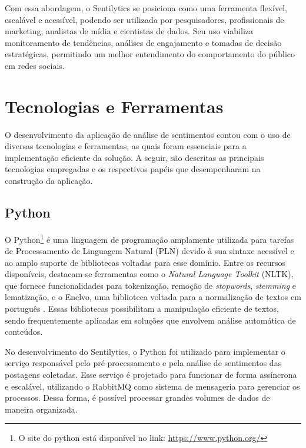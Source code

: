 \documentclass[
	12pt,				%
	oneside,			%
	a4paper,			%
	english,			%
	french,				%
	spanish,			%
	brazil				%
	]{abntex2}
\begin{document}
Com essa abordagem, o Sentilytics se posiciona como uma ferramenta
flexível, escalável e acessível, podendo ser utilizada por
pesquisadores, profissionais de marketing, analistas de mídia e
cientistas de dados. Seu uso viabiliza monitoramento de tendências,
análises de engajamento e tomadas de decisão estratégicas, permitindo um
melhor entendimento do comportamento do público em redes sociais.

\hypertarget{tecnologias-e-ferramentas}{%
\section{Tecnologias e Ferramentas}\label{tecnologias-e-ferramentas}}

O desenvolvimento da aplicação de análise de sentimentos contou com o
uso de diversas tecnologias e ferramentas, as quais foram essenciais
para a implementação eficiente da solução. A seguir, são descritas as
principais tecnologias empregadas e os respectivos papéis que
desempenharam na construção da aplicação.

\hypertarget{python}{%
\subsection{Python}\label{python}}

O Python\footnote{O site do python está disponível no link:
  \url{https://www.python.org/}} é uma linguagem de programação
amplamente utilizada para tarefas de Processamento de Linguagem Natural
(PLN) devido à sua sintaxe acessível e ao amplo suporte de bibliotecas
voltadas para esse domínio. Entre os recursos disponíveis, destacam-se
ferramentas como o \emph{Natural Language Toolkit} (NLTK), que fornece
funcionalidades para tokenização, remoção de \emph{stopwords},
\emph{stemming} e lematização, e o Enelvo, uma biblioteca voltada para a
normalização de textos em português \cite{bertaglia2016exploring}. Essas
bibliotecas possibilitam a manipulação eficiente de textos, sendo
frequentemente aplicadas em soluções que envolvem análise automática de
conteúdos.

No desenvolvimento do Sentilytics, o Python foi utilizado para
implementar o serviço responsável pelo pré-processamento e pela análise
de sentimentos das postagens coletadas. Esse serviço é projetado para
funcionar de forma assíncrona e escalável, utilizando o RabbitMQ como
sistema de mensageria para gerenciar os processos. Dessa forma, é
possível processar grandes volumes de dados de maneira organizada.
\end{document}
